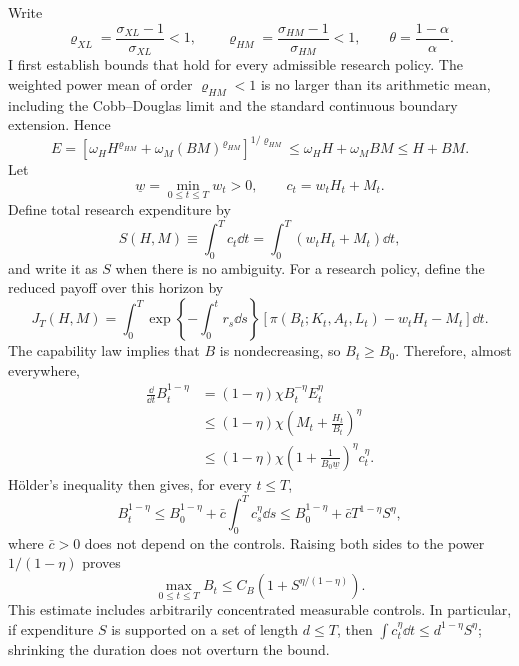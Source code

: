Write
\[
 \varrho_{XL}=\frac{\sigma_{XL}-1}{\sigma_{XL}}<1,
 \qquad
 \varrho_{HM}=\frac{\sigma_{HM}-1}{\sigma_{HM}}<1,
 \qquad
 \theta=\frac{1-\alpha}{\alpha}.
\]
I first establish bounds that hold for every admissible research policy. The
weighted power mean of order \(\varrho_{HM}<1\) is no larger than its arithmetic
mean, including the Cobb--Douglas limit and the standard continuous boundary
extension. Hence
\[
 E=\left[\omega_HH^{\varrho_{HM}}
 +\omega_M(BM)^{\varrho_{HM}}\right]^{1/\varrho_{HM}}
 \leq \omega_HH+\omega_MBM
 \leq H+BM.
\]
Let
\[
 \underline w=\min_{0\leq t\leq T}w_t>0,
 \qquad c_t=w_tH_t+M_t.
\]
Define total research expenditure by
\begin{equation}
 S(H,M)\equiv\int_0^T c_t\dd t
 =\int_0^T(w_tH_t+M_t)\dd t,
 \label{eq:axm-research-total-expenditure}
\end{equation}
and write it as \(S\) when there is no ambiguity.
For a research policy, define the reduced payoff over this horizon by
\[
 J_T(H,M)=\int_0^T
 \exp\left\{-\int_0^t r_s\dd s\right\}
 [\pi(B_t;K_t,A_t,L_t)-w_tH_t-M_t]\dd t.
\]
The capability law implies that \(B\) is nondecreasing, so \(B_t\geq B_0\).
Therefore, almost everywhere,
\begin{align*}
 \frac{\dd}{\dd t}B_t^{1-\eta}
 &=(1-\eta)\chi B_t^{-\eta}E_t^\eta\\
 &\leq(1-\eta)\chi
       \left(M_t+\frac{H_t}{B_t}\right)^\eta\\
 &\leq(1-\eta)\chi
       \left(1+\frac{1}{B_0\underline w}\right)^\eta c_t^\eta.
\end{align*}
H\"older's inequality then gives, for every \(t\leq T\),
\[
 B_t^{1-\eta}
 \leq B_0^{1-\eta}
 +\bar c\int_0^T c_s^\eta\dd s
 \leq B_0^{1-\eta}+\bar cT^{1-\eta}S^\eta,
\]
where \(\bar c>0\) does not depend on the controls. Raising both sides to
the power \(1/(1-\eta)\) proves
\begin{equation}
 \max_{0\leq t\leq T}B_t
 \leq C_B\left(1+S^{\eta/(1-\eta)}\right).
 \label{eq:axm-finite-horizon-capability-bound}
\end{equation}
This estimate includes arbitrarily concentrated measurable controls. In
particular, if expenditure \(S\) is supported on a set of length \(d\leq T\),
then \(\int c_t^\eta\dd t\leq d^{1-\eta}S^\eta\); shrinking the duration does
not overturn the bound.

